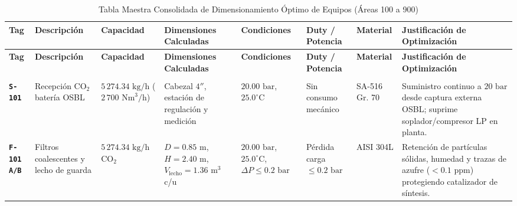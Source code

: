 \documentclass[11pt,letterpaper]{article}
\begin{document}
\begin{landscape}
\renewcommand{\arraystretch}{0.88}
\setlength{\tabcolsep}{3pt}\fontsize{7pt}{8.5pt}\selectfont\begin{xltabular}{\linewidth}{>{\ttfamily\bfseries}p{1.5cm} >{\raggedright\arraybackslash}p{2.3cm} >{\raggedright\arraybackslash}p{2.0cm} >{\raggedright\arraybackslash}p{3.1cm} >{\raggedright\arraybackslash}p{2.0cm} >{\raggedright\arraybackslash}p{2.4cm} >{\raggedright\arraybackslash}p{2.1cm} X}
    \caption{Tabla Maestra Consolidada de Dimensionamiento Óptimo de Equipos (Áreas 100 a 900)} \label{tab:maestra_dimensionamiento} \\
    \toprule
    \textbf{\color{white}Tag} & \textbf{\color{white}Descripción} & \textbf{\color{white}Capacidad} & \textbf{\color{white}Dimensiones Calculadas} & \textbf{\color{white}Condiciones} & \textbf{\color{white}Duty / Potencia} & \textbf{\color{white}Material} & \textbf{\color{white}Justificación de Optimización} \\
    \midrule
    \endfirsthead
    \toprule
    \textbf{\color{white}Tag} & \textbf{\color{white}Descripción} & \textbf{\color{white}Capacidad} & \textbf{\color{white}Dimensiones Calculadas} & \textbf{\color{white}Condiciones} & \textbf{\color{white}Duty / Potencia} & \textbf{\color{white}Material} & \textbf{\color{white}Justificación de Optimización} \\
    \midrule
    \endhead
    \bottomrule
    \endfoot
    
     \\
    \texttt{S-101} & Recepción $\text{CO}_2$ batería OSBL & $5\,274.34\text{ kg/h}$ ($2\,700\text{ Nm}^3\text{/h}$) & Cabezal $4''$, estación de regulación y medición & $20.00\text{ bar}$, $25.0^\circ\text{C}$ & Sin consumo mecánico & SA-516 Gr. 70 & Suministro continuo a $20\text{ bar}$ desde captura externa OSBL; suprime soplador/compresor LP en planta. \\
    \texttt{F-101 A/B} & Filtros coalescentes y lecho de guarda & $5\,274.34\text{ kg/h}$ $\text{CO}_2$ & $D = 0.85\text{ m}$, $H = 2.40\text{ m}$, $V_{\text{lecho}} = 1.36\text{ m}^3$ c/u & $20.00\text{ bar}$, $25.0^\circ\text{C}$, $\Delta P \le 0.2\text{ bar}$ & Pérdida carga $\le 0.2\text{ bar}$ & AISI 304L & Retención de partículas sólidas, humedad y trazas de azufre ($< 0.1\text{ ppm}$) protegiendo catalizador de síntesis. \\
    

\end{xltabular}
\end{landscape}
\end{document}
